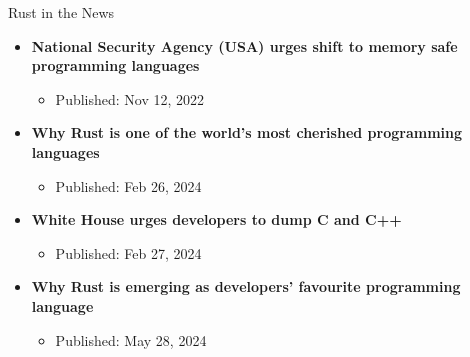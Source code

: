 \documentclass[10pt,aspectratio=169]{beamer}
\begin{document}
\begin{frame}{Rust in the News}
    \begin{itemize}
        \item \textbf{National Security Agency (USA) urges shift to memory safe programming languages}
        \begin{itemize}
            \item Published: Nov 12, 2022
        \end{itemize}
        \item \textbf{Why Rust is one of the world's most cherished programming languages}
        \begin{itemize}
            \item Published: Feb 26, 2024
        \end{itemize}
        \item \textbf{White House urges developers to dump C and C++}
        \begin{itemize}
            \item Published: Feb 27, 2024
        \end{itemize}
        \item \textbf{Why Rust is emerging as developers’ favourite programming language}
        \begin{itemize}
            \item Published: May 28, 2024
        \end{itemize}
    \end{itemize}    
\end{frame}
\end{document}
